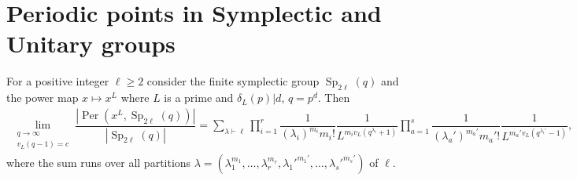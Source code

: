\documentclass[11pt,twoside]{amsart}
\newcommand{\per}{\operatorname{Per}}
\newcommand{\Sp}{\operatorname{Sp}}
\theoremstyle{definition} %
\begin{document}
\section{Periodic points in Symplectic and Unitary groups}\label{sec:symporth}

\begin{theorem}\label{thm:symp}
    For a positive integer $\ell\geq 2$ consider the finite symplectic group $\Sp_{2\ell}(q)$ and the power map $x\mapsto x^L$ where $L$ is a prime and $\delta_L(p)|d$, $q=p^d$. Then 
    \begin{align*}
        \lim\limits_{\substack{q\longrightarrow\infty\\v_L(q-1)=c}}\dfrac{|\per(x^L,\Sp_{2\ell}(q))|}{|\Sp_{2\ell}(q)|}= \sum\limits_{\lambda\vdash \ell}\prod\limits_{i=1}^r\dfrac{1}{(\lambda_i)^{m_i}m_i!}\dfrac{1}{L^{m_iv_L(q^{\lambda_i}+1)}}\prod\limits_{a=1}^{s}\dfrac{1}{(\lambda_a')^{m_a'}m_a'!}\dfrac{1}{L^{m_a'v_L(q^{\lambda_i'}-1)}},
    \end{align*}
    where the sum runs over all partitions $\lambda=(\lambda_1^{m_1},\ldots,\lambda_r^{m_r},\lambda_1'^{m_1'},\ldots,\lambda_s'^{m_s'})$ of $\ell$.
\end{theorem}
\end{document}
